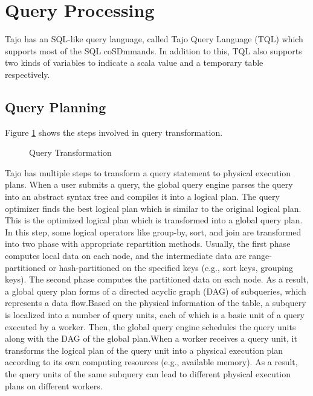 \documentclass[9pt,twocolumn,twoside]{styles/osajnl}
\begin{document}
\section{Query Processing}
Tajo has an SQL-like query language, called
\cite{www-apache-tajo-tsql} Tajo Query Language (TQL) which supports
most of the SQL coSDmmands. In addition to this, TQL also supports two
kinds of variables to indicate a scala value and a temporary table
respectively.

\subsection{Query Planning}

Figure \ref{fig:queryplanning} shows the steps involved in query transformation. 

\begin{figure}[htbp]
\centering
{}
\caption{\cite{tajo-paper} Query Transformation}
\label{fig:queryplanning}
\end{figure}

\noindent
\cite{tajo-paper} \cite{www-apache-tajo}Tajo has multiple steps to
transform a query statement to physical execution plans. When a user
submits a query, the global query engine parses the query into an
abstract syntax tree and compiles it into a logical plan. The query
optimizer finds the best logical plan which is similar to the original
logical plan. This is the optimized logical plan which is transformed
into a global query plan. In this step, some logical operators like
group-by, sort, and join are transformed into two phase with
appropriate repartition methods. Usually, the first phase computes
local data on each node, and the intermediate data are
range-partitioned or hash-partitioned on the specified keys (e.g.,
sort keys, grouping keys). The second phase computes the partitioned
data on each node. As a result, a global query plan forms of a
directed acyclic graph (DAG) of subqueries, which represents a data
flow.Based on the physical information of the table, a subquery is
localized into a number of query units, each of which is a basic unit
of a query executed by a worker. Then, the global query engine
schedules the query units along with the DAG of the global
plan.\newline \newline When a worker receives a query unit, it
transforms the logical plan of the query unit into a physical
execution plan according to its own computing resources (e.g.,
available memory). As a result, the query units of the same subquery
can lead to different physical execution plans on different workers.
\end{document}
